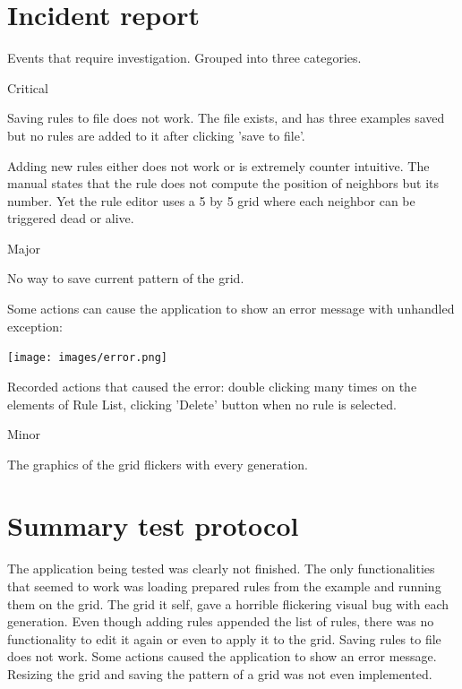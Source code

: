 \documentclass{article}
\begin{document}
\section{Incident report}
Events that require investigation. Grouped into three categories.

	\begin{legal}
		\item {\color{red}Critical}
		\begin{legal}
		
			\item Saving rules to file does not work. The file exists, and has three examples saved 
			but no rules are added to it after clicking 'save to file'.
			
			\item Adding new rules either does not work or is extremely counter intuitive.
			The manual states that the rule does not compute the position of neighbors but its number.
			Yet the rule editor uses a 5 by 5 grid where each neighbor can be triggered dead or alive.
	
			

		\end{legal}		

		\item {\color{orange}Major}
		\begin{legal}


			\item No way to save current pattern of the grid.
			
			\item Some actions can cause the application to show an error message with unhandled exception:
			\begin{center}
				\texttt{[image: images/error.png]} \\
			\end{center}		
			Recorded actions that caused the error: double clicking many times on the elements of Rule List, clicking 'Delete' button when no rule is selected.
		\end{legal}

		\item {\color{blue}Minor}
		\begin{legal}
			\item The graphics of the grid flickers with every generation.
		\end{legal}
		
	\end{legal}


\section{Summary test protocol}
The application being tested was clearly not finished. The only functionalities that seemed to work was loading prepared rules from the example and running them on the grid. The grid it self, gave a horrible flickering visual bug with each generation. Even though adding rules appended the list of rules, there was no functionality to edit it again or even to apply it to the grid. Saving rules to file does not work.
Some actions caused the application to show an error message. 
Resizing the grid and saving the pattern of a grid was not even implemented.
\end{document}
